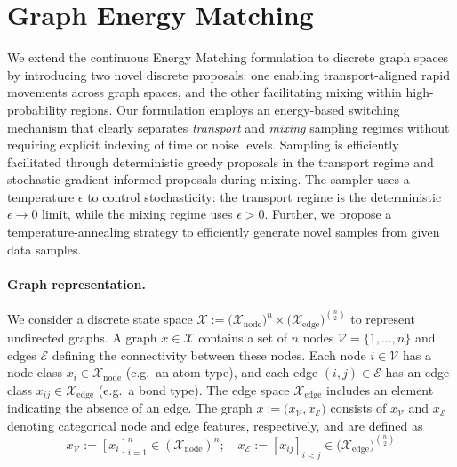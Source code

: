 \section{Graph Energy Matching}
\label{sec:gem}
We extend the continuous Energy Matching formulation to discrete graph spaces by introducing two novel discrete proposals: one enabling transport-aligned rapid movements across graph spaces, and the other facilitating mixing within high-probability regions. Our formulation employs an energy-based switching mechanism that clearly separates \emph{transport} and \emph{mixing} sampling regimes without requiring explicit indexing of time or noise levels. Sampling is efficiently facilitated through deterministic greedy proposals in the transport regime and stochastic gradient-informed proposals during mixing. The sampler uses a temperature $\epsilon$ to control stochasticity: the transport regime is the deterministic $\epsilon\to 0$ limit, while the mixing regime uses $\epsilon>0$. Further, we propose a temperature-annealing strategy to efficiently generate novel samples from given data samples.

\paragraph{Graph representation.} 
We consider a discrete state space $\mathcal{X}:=\big(\mathcal{X}_{\mathrm{node}}\big)^{n}\times\big(\mathcal{X}_{\mathrm{edge}}\big)^{\binom{n}{2}}$ to represent undirected graphs. A graph $x\in \mathcal{X}$ contains a set of $n$ nodes $\mathcal{V}=\{1,\dots,n\}$ and edges $\mathcal{E}$ defining the connectivity between these nodes. Each node $i\in\mathcal{V}$ has a node class $x_i \in \mathcal{X}_{\mathrm{node}}$ (e.g.\ an atom type), and each edge $(i,j)\in\mathcal{E}$ has an edge class $x_{ij}\in\mathcal{X}_{\mathrm{edge}}$ (e.g.\ a bond type). The edge space $\mathcal{X}_{\mathrm{edge}}$ includes an element indicating the absence of an edge. The graph $x:=\big(x_\mathcal{V},x_\mathcal{E}\big)$ consists of $x_\mathcal{V}$ and $x_\mathcal{E}$ denoting categorical node and edge features, respectively, and are defined as
\begin{equation}
x_\mathcal{V}  :=[x_i]_{i=1}^n\in(\mathcal{X}_{\mathrm{node}})^n;\quad
x_\mathcal{E}  :=[x_{ij}]_{ i<j}\in\big(\mathcal{X}_{\mathrm{edge}}\big)^{\binom{n}{2}}\nonumber
\end{equation}

